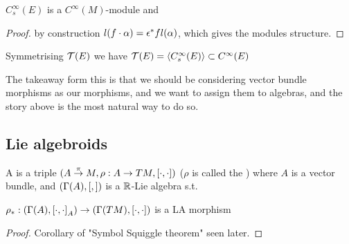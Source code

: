 \documentclass{article}
\begin{document}
\begin{prop}
$C_s^\infty(E)$ is a $C^\infty(M)$-module and 
\end{prop}
\begin{proof}
by construction $l(f \cdot \alpha) = \epsilon^\ast f l(\alpha)$, which gives the modules structure. 
\end{proof}

\begin{prop}
Symmetrising $\mathcal{T}(E)$ we have $\mathcal{T}(E) = \left\langle C_s^\infty(E) \right\rangle \subset C^\infty(E)$
\end{prop}

\begin{idea}
The takeaway form this is that we should be considering vector bundle morphisms as our morphisms, and we want to assign them to algebras, and the story above is the most natural way to do so. 
\end{idea}


\subsection{Lie algebroids}

\begin{definition}
A  is a triple $(A \overset{\pi}{\to}M, \rho:A \to TM, \left[ \cdot, \cdot \right])$ ($\rho$ is called the ) where $A$ is a vector bundle, and $(\Gamma(A),\left[ ,  \right])$ is a $\mathbb{R}$-Lie algebra s.t. 
\end{definition}

\begin{prop}
$\rho_\ast : (\Gamma(A),\left[ \cdot, \cdot \right]_A) \to (\Gamma(TM),\left[ \cdot, \cdot \right])$ is a LA morphism
\end{prop}
\begin{proof}
Corollary of "Symbol Squiggle theorem" seen later. 
\end{proof}
\end{document}
